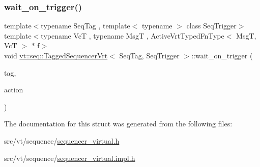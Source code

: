 \mbox{\label{structvt_1_1seq_1_1_tagged_sequencer_vrt_a768f8c419f42b3dad84ebce3f046f0e9}} 
\subsubsection{\texorpdfstring{wait\+\_\+on\+\_\+trigger()}{wait\_on\_trigger()}}
{\footnotesize\ttfamily template$<$typename Seq\+Tag , template$<$ typename $>$ class Seq\+Trigger$>$ \\
template$<$typename VcT , typename MsgT , Active\+Vrt\+Typed\+Fn\+Type$<$ Msg\+T, Vc\+T $>$ $\ast$ f$>$ \\
void \hyperlink{structvt_1_1seq_1_1_tagged_sequencer_vrt}{vt\+::seq\+::\+Tagged\+Sequencer\+Vrt}$<$ Seq\+Tag, Seq\+Trigger $>$\+::wait\+\_\+on\+\_\+trigger (\begin{DoxyParamCaption}\item[{\hyperlink{namespacevt_a84ab281dae04a52a4b243d6bf62d0e52}{Tag\+Type} const \&}]{tag,  }\item[{\hyperlink{structvt_1_1seq_1_1_tagged_sequencer_a0210dbd34288d440e0cd51db9d6637bd}{Seq\+Action\+Type}$<$ MsgT, VcT $>$}]{action }\end{DoxyParamCaption})}



The documentation for this struct was generated from the following files\+:\begin{DoxyCompactItemize}
\item 
src/vt/sequence/\hyperlink{sequencer__virtual_8h}{sequencer\+\_\+virtual.\+h}\item 
src/vt/sequence/\hyperlink{sequencer__virtual_8impl_8h}{sequencer\+\_\+virtual.\+impl.\+h}\end{DoxyCompactItemize}
